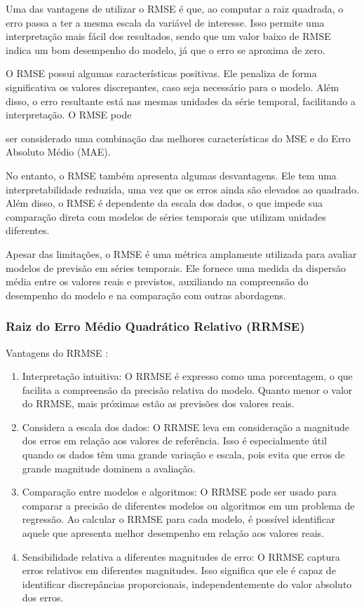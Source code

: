 Uma das vantagens de utilizar o RMSE é que, ao computar a raiz quadrada, o erro passa a ter a mesma escala da variável de interesse. Isso permite uma interpretação mais fácil dos resultados, sendo que um valor baixo de RMSE indica um bom desempenho do modelo, já que o erro se aproxima de zero.

O RMSE possui algumas características positivas. Ele penaliza de forma significativa os valores discrepantes, caso seja necessário para o modelo. Além disso, o erro resultante está nas mesmas unidades da série temporal, facilitando a interpretação. O RMSE pode

ser considerado uma combinação das melhores características do MSE e do Erro Absoluto Médio (MAE).

No entanto, o RMSE também apresenta algumas desvantagens. Ele tem uma interpretabilidade reduzida, uma vez que os erros ainda são elevados ao quadrado. Além disso, o RMSE é dependente da escala dos dados, o que impede sua comparação direta com modelos de séries temporais que utilizam unidades diferentes.

Apesar das limitações, o RMSE é uma métrica amplamente utilizada para avaliar modelos de previsão em séries temporais. Ele fornece uma medida da dispersão média entre os valores reais e previstos, auxiliando na compreensão do desempenho do modelo e na comparação com outras abordagens.

\subsubsection{Raiz do Erro M\'edio Quadr\'atico Relativo (RRMSE)}\label{subsub:rrmse}

Vantagens do RRMSE :

\begin{enumerate}
	\item  Interpretação intuitiva: O RRMSE é expresso como uma porcentagem, o que facilita a compreensão da precisão relativa do modelo. Quanto menor o valor do RRMSE, mais próximas estão as previsões dos valores reais.
	
	\item  Considera a escala dos dados: O RRMSE leva em consideração a magnitude dos erros em relação aos valores de referência. Isso é especialmente útil quando os dados têm uma grande variação e escala, pois evita que erros de grande magnitude dominem a avaliação.
	
	\item  Comparação entre modelos e algoritmos: O RRMSE pode ser usado para comparar a precisão de diferentes modelos ou algoritmos em um problema de regressão. Ao calcular o RRMSE para cada modelo, é possível identificar aquele que apresenta melhor desempenho em relação aos valores reais.
	
	\item  Sensibilidade relativa a diferentes magnitudes de erro: O RRMSE captura erros relativos em diferentes magnitudes. Isso significa que ele é capaz de identificar discrepâncias proporcionais, independentemente do valor absoluto dos erros.
\end{enumerate}

